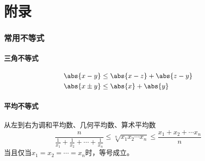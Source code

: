 \part{附录}

\section{常用不等式}
\subsection{三角不等式}
\begin{align}
    \label{eq:三角不等式}
    \abs{x-y}     & \leq \abs{x-z} + \abs{z-y} \\
    \abs{x \pm y} & \leq \abs{x} + \abs{y}
\end{align}


\subsection{平均不等式}
从左到右为调和平均数、几何平均数、算术平均数
\begin{equation}
    \label{eq:平均不等式}
    \frac{n}{\frac{1}{x_1} + \frac{1}{x_2} + \cdots + \frac{1}{x_n}}
    \leq \sqrt[n]{x_1x_2 \cdots x_n}
    \leq \frac{x_1 + x_2 + \cdots x_n}{n}
\end{equation}
当且仅当$ x_1 = x_2 = \cdots = x_n $时，等号成立。

